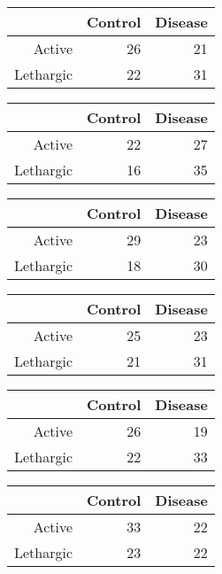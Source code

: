 \documentclass{article}\usepackage{graphicx, color}
\begin{document}
\begin{multicols}{3}
\bigskip
\begin{tabular}{rrr}
  \hline
 & Control & Disease \\ 
  \hline
Active &  26 &  21 \\ 
  Lethargic &  22 &  31 \\ 
   \hline
\end{tabular}


\bigskip
\begin{tabular}{rrr}
  \hline
 & Control & Disease \\ 
  \hline
Active &  22 &  27 \\ 
  Lethargic &  16 &  35 \\ 
   \hline
\end{tabular}


\bigskip
\begin{tabular}{rrr}
  \hline
 & Control & Disease \\ 
  \hline
Active &  29 &  23 \\ 
  Lethargic &  18 &  30 \\ 
   \hline
\end{tabular}


\bigskip
\begin{tabular}{rrr}
  \hline
 & Control & Disease \\ 
  \hline
Active &  25 &  23 \\ 
  Lethargic &  21 &  31 \\ 
   \hline
\end{tabular}


\bigskip
\begin{tabular}{rrr}
  \hline
 & Control & Disease \\ 
  \hline
Active &  26 &  19 \\ 
  Lethargic &  22 &  33 \\ 
   \hline
\end{tabular}


\bigskip
\begin{tabular}{rrr}
  \hline
 & Control & Disease \\ 
  \hline
Active &  33 &  22 \\ 
  Lethargic &  23 &  22 \\ 
   \hline
\end{tabular}



\end{multicols}
\end{document}

